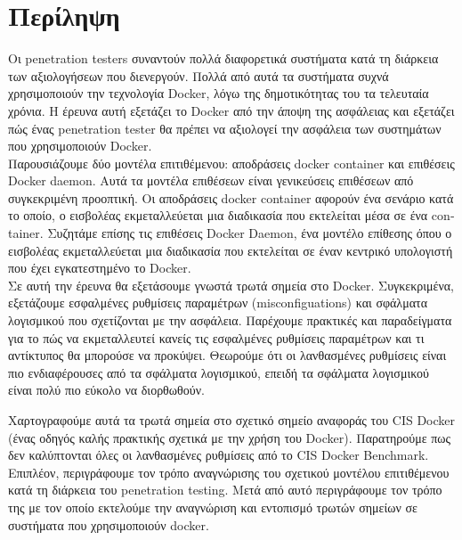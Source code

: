 \section{Περίληψη}
\label{Abstract}

Οι \textlatin{penetration testers} συναντούν πολλά διαφορετικά συστήματα
κατά τη διάρκεια των αξιολογήσεων που διενεργούν. Πολλά από αυτά τα συστήματα
συχνά χρησιμοποιούν την τεχνολογία \textlatin{Docker},
λόγω της δημοτικότητας του τα τελευταία χρόνια. Η έρευνα αυτή
εξετάζει το \textlatin{Docker} από την άποψη της ασφάλειας και εξετάζει πώς
ένας \textlatin{penetration tester} θα πρέπει να αξιολογεί την ασφάλεια των
συστημάτων που χρησιμοποιούν \textlatin{Docker}.\mbox{} \\

Παρουσιάζουμε δύο μοντέλα επιτιθέμενου: αποδράσεις \textlatin{docker container}
και επιθέσεις \textlatin{Docker daemon}. Αυτά τα μοντέλα επιθέσεων είναι
γενικεύσεις επιθέσεων από συγκεκριμένη προοπτική. Οι αποδράσεις
\textlatin{docker container} αφορούν ένα σενάριο κατά το οποίο, ο
εισβολέας εκμεταλλεύεται μια διαδικασία που εκτελείται μέσα
σε ένα \textlatin{container}. Συζητάμε επίσης τις επιθέσεις
\textlatin{Docker Daemon}, ένα μοντέλο επίθεσης όπου ο εισβολέας εκμεταλλεύεται
μια διαδικασία που εκτελείται σε έναν κεντρικό υπολογιστή που έχει
εγκατεστημένο το \textlatin{Docker}.\mbox{} \\

Σε αυτή την έρευνα θα εξετάσουμε γνωστά τρωτά σημεία στο \textlatin{Docker}.
Συγκεκριμένα, εξετάζουμε εσφαλμένες ρυθμίσεις παραμέτρων 
(\textlatin{misconfiguations}) και σφάλματα λογισμικού που
σχετίζονται με την ασφάλεια. Παρέχουμε πρακτικές και παραδείγματα για το πώς να
εκμεταλλευτεί κανείς τις εσφαλμένες ρυθμίσεις παραμέτρων και τι
αντίκτυπος θα μπορούσε να προκύψει. Θεωρούμε ότι οι λανθασμένες ρυθμίσεις
είναι πιο ενδιαφέρουσες από τα σφάλματα λογισμικού, επειδή τα σφάλματα
λογισμικού είναι πολύ πιο εύκολο να διορθωθούν.

Χαρτογραφούμε αυτά τα τρωτά σημεία στο σχετικό σημείο αναφοράς του
\textlatin{CIS Docker} (ένας οδηγός καλής πρακτικής σχετικά με την χρήση του
\textlatin{Docker}). Παρατηρούμε πως δεν καλύπτονται όλες οι λανθασμένες
ρυθμίσεις από το \textlatin{CIS Docker Benchmark}.\mbox{} \\

Επιπλέον, περιγράφουμε τον τρόπο αναγνώρισης του σχετικού μοντέλου
επιτιθέμενου κατά τη διάρκεια του \textlatin{penetration testing}.
Μετά από αυτό περιγράφουμε τον τρόπο της με τον οποίο εκτελούμε την αναγνώριση
και εντοπισμό τρωτών σημείων σε συστήματα που χρησιμοποιούν
\textlatin{docker}.\mbox{} \\

